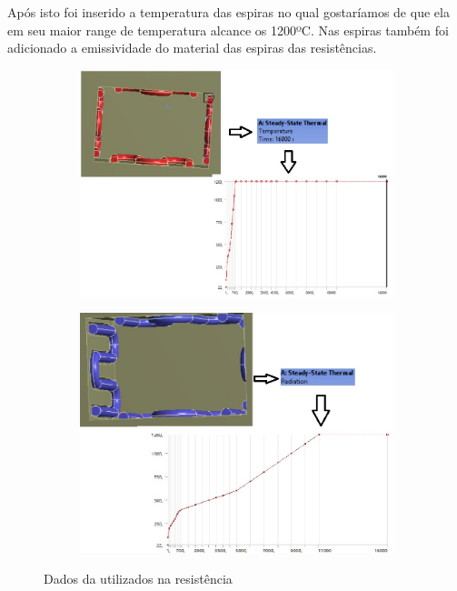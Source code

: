 Após isto foi inserido a temperatura das espiras no qual gostaríamos de que ela em seu
maior range de temperatura alcance os 1200ºC. Nas espiras também foi adicionado a emissividade
do material das espiras das resistências.
\begin{figure}[ht]
\centering
    \begin{subfigure}{0.49\linewidth} \centering
        \includegraphics[scale=0.5]{figuras/ansys10.jpg}
        \label{ansys10}
    \end{subfigure}
    \begin{subfigure}{0.49\linewidth} \centering
        \includegraphics[scale=0.5]{figuras/ansys6.jpg}
        \label{ansys6}
    \end{subfigure}
    \caption{Dados da utilizados na resistência}
\end{figure}

